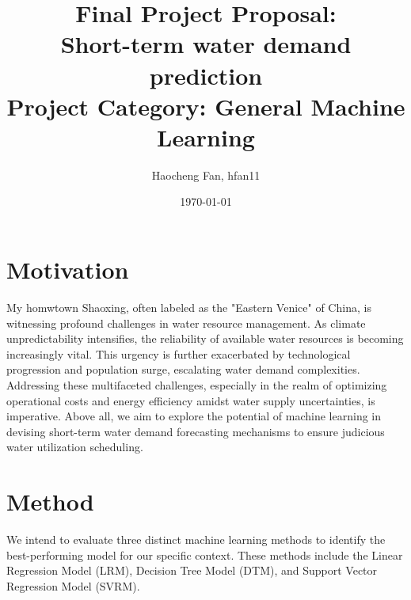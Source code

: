 \documentclass[12pt]{article}
\title{
    \textbf{Final Project Proposal: \\Short-term water demand prediction} \\
    \vspace{0.5em}
    \large Project Category: General Machine Learning
}
\author{
    Haocheng Fan, hfan11 \\
}
\date{\today}
\begin{document}
\maketitle

\section*{Motivation}
My homwtown Shaoxing, often labeled as the "Eastern Venice" of China, is witnessing profound challenges in water resource management. 
As climate unpredictability intensifies, the reliability of available water resources is becoming increasingly vital. 
This urgency is further exacerbated by technological progression and population surge, escalating water demand complexities. 
Addressing these multifaceted challenges, especially in the realm of optimizing operational costs and energy efficiency amidst water supply uncertainties, 
is imperative. Above all, we aim to explore the potential of machine learning in devising short-term water demand forecasting mechanisms to ensure judicious water utilization scheduling.

\section*{Method}

We intend to evaluate three distinct machine learning methods to identify the best-performing model for our specific context. These methods include the Linear Regression Model (LRM), Decision Tree Model (DTM), and Support Vector Regression Model (SVRM).
 
\end{document}
